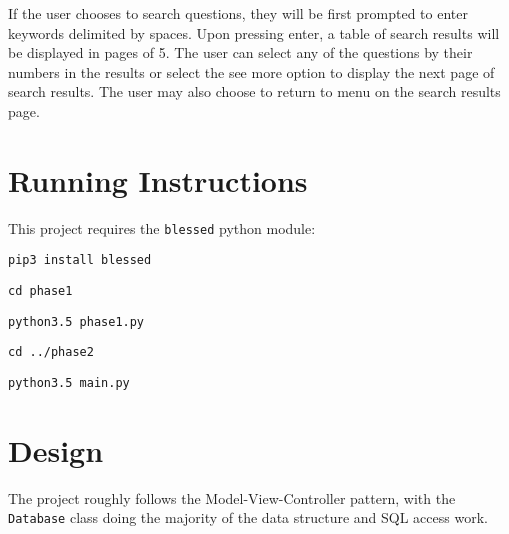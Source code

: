 \documentclass{article}
\begin{document}
If the user chooses to search questions, they will be first prompted to enter keywords delimited by spaces. Upon pressing enter, a table of search results will be displayed in pages of 5. The user can select any of the questions by their numbers in the results or select the see more option to display the next page of search results. The user may also choose to return to menu on the search results page. 

\section{Running Instructions}

This project requires the \verb|blessed| python module:

\verb|pip3 install blessed|

\verb|cd phase1|

\verb|python3.5 phase1.py|

\verb|cd ../phase2|

\verb|python3.5 main.py|

\section{Design}

The project roughly follows the Model-View-Controller pattern, with the \verb|Database| class doing the majority of the data structure and SQL access work. %


\end{document}
